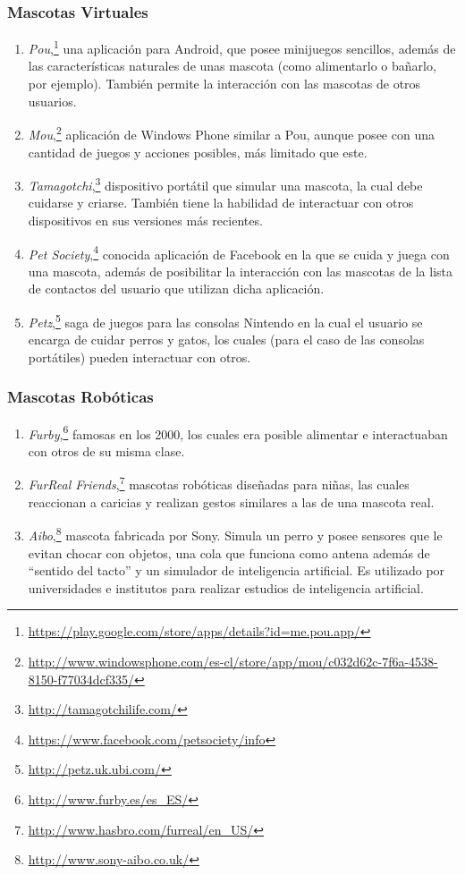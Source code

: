 \subsubsection{ Mascotas Virtuales}
  \begin{enumerate}
  \item \emph{Pou},\footnote{\url{https://play.google.com/store/apps/details?id=me.pou.app/}} una aplicaci\'on para Android, que posee minijuegos sencillos, adem\'as de las caracter\'isticas naturales de unas mascota (como alimentarlo o ba\~narlo, por ejemplo). Tambi\'en permite la interacci\'on con las mascotas de otros usuarios.
  \item \emph{Mou},\footnote{\url{http://www.windowsphone.com/es-cl/store/app/mou/c032d62c-7f6a-4538-8150-f77034dcf335/}} aplicaci\'on de Windows Phone similar a Pou, aunque posee con una cantidad de juegos y acciones posibles, m\'as limitado que este.
  \item \emph{Tamagotchi},\footnote{\url{http://tamagotchilife.com/}} dispositivo port\'atil que simular una mascota, la cual debe cuidarse y criarse. Tambi\'en tiene la habilidad de interactuar con otros dispositivos en sus versiones m\'as recientes.
  \item \emph{Pet Society},\footnote{\url{https://www.facebook.com/petsociety/info}} conocida aplicaci\'on de Facebook en la que se cuida y juega con una mascota, adem\'as de posibilitar la interacci\'on con las mascotas de la lista de contactos del usuario que utilizan dicha aplicaci\'on.
  \item \emph{Petz},\footnote{\url{http://petz.uk.ubi.com/}} saga de juegos para las consolas Nintendo en la cual el usuario se encarga de cuidar perros y gatos, los cuales (para el caso de las consolas port\'atiles) pueden interactuar con otros.
  \end{enumerate}
\subsubsection{Mascotas Rob\'oticas}
  \begin{enumerate}
  \item \emph{Furby},\footnote{\url{http://www.furby.es/es_ES/}} famosas en los 2000, los cuales era posible alimentar e interactuaban con otros de su misma clase.
  \item \emph{FurReal Friends},\footnote{\url{http://www.hasbro.com/furreal/en_US/}} mascotas rob\'oticas dise\~nadas para ni\~nas, las cuales reaccionan a caricias y realizan gestos similares a las de una mascota real.
  \item \emph{Aibo},\footnote{\url{http://www.sony-aibo.co.uk/}} mascota fabricada por Sony. Simula un perro y posee sensores que le evitan chocar con objetos, una cola que funciona como antena adem\'as de ``sentido del tacto'' y un simulador de inteligencia artificial. Es utilizado por universidades e institutos para realizar estudios de inteligencia artificial.
  \end{enumerate}


